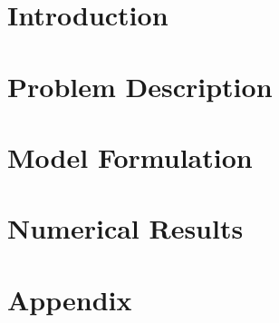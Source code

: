 \documentclass[11pt,twoside,a4paper]{article}
\theoremstyle{definition}
\newcommand{\1}{1{\hskip -2.55 pt}\hbox{I}}
\begin{document}
\newlength\figureheight
\newlength\figurewidth
\title{}
\author{}

\maketitle

\begin{abstract}


\end{abstract}


%
\printnomenclature
\section{Introduction}\label{sec:Intro}


\section{Problem Description}\label{sec:pd}

\section{Model Formulation}\label{sec:Model}

%
\section{Numerical Results}\label{sec:Results}

%
\section{Appendix}\label{sec:Appendix}





\clearpage
 
 
\end{document}
